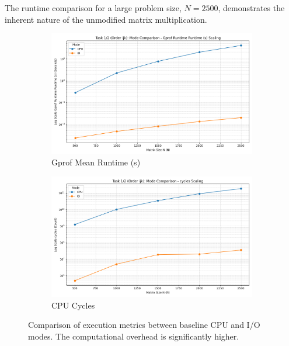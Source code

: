 \documentclass[11pt, a4paper]{article}
\begin{document}
The runtime comparison for a large problem size, $N=2500$, demonstrates the inherent nature of the unmodified matrix multiplication.
\begin{figure}[h] %
    \centering
    \begin{subfigure}[b]{0.48\textwidth}
        \centering
        \includegraphics[width=\textwidth]{plots/task_1_2_(order_ijk)_mode_comparison_-__gprof_runtime_mean_s.png}
        \caption{Gprof Mean Runtime (s)}
        \label{fig:t1_gprof_runtime_comp}
    \end{subfigure}
    \hfill
    \begin{subfigure}[b]{0.48\textwidth}
        \centering
        \includegraphics[width=\textwidth]{plots/task_1_2_(order_ijk)_mode_comparison_-__cycles.png}
        \caption{CPU Cycles}
        \label{fig:t1_cycles_comp}
    \end{subfigure}
    \caption{Comparison of execution metrics between baseline CPU and I/O modes. The computational overhead is significantly higher.}
\end{figure}
\end{document}
